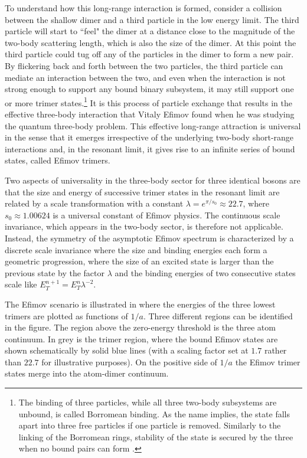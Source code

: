 To understand how this long-range interaction is formed, consider a collision between the shallow dimer and a third particle in the low energy limit. The third particle will start to ``feel" the dimer at a distance close to the magnitude of the two-body scattering length, which is also the size of the dimer. At this point the third particle could tug off any of the particles in the dimer to form a new pair. By flickering back and forth between the two particles, the third particle can mediate an interaction between the two, and even when the interaction is not strong enough to support any bound binary subsystem, it may still support one or more trimer states.\footnote{The binding of three particles, while all three two-body subsystems are unbound, is called Borromean binding. As the name implies, the state falls apart into three free particles if one particle is removed. Similarly to the linking of the Borromean rings, stability of the state is secured by the three when no bound pairs can form \cite{Kajsa_my}.} It is this process of particle exchange that results in the effective three-body interaction that Vitaly Efimov found when he was studying the quantum three-body problem. This effective long-range attraction is universal in the sense that it emerges irrespective of the underlying two-body short-range interactions and, in the resonant limit, it gives rise to an infinite series of bound states, called Efimov trimers.

Two aspects of universality in the three-body sector for three identical bosons are that the size and energy of successive trimer states in the resonant limit are related by a scale transformation with a constant $\lambda = e^{\pi/s_0} \approx 22.7$, where $s_0 \approx 1.00624$ is a universal constant of Efimov physics. The continuous scale invariance, which appears in the two-body sector, is therefore not applicable. Instead, the symmetry of the asymptotic Efimov spectrum is characterized by a discrete scale invariance where the size and binding energies each form a geometric progression, where the size of an excited state is larger than the previous state by the factor $\lambda$ and the binding energies of two consecutive states scale like $E_T^{n+1} = E_T^{n}\lambda^{-2}$.   

The Efimov scenario is illustrated in  where the energies of the three lowest trimers are plotted as functions of $1/a$. Three different regions can be identified in the figure. The region above the zero-energy threshold is the three atom continuum. In grey is the trimer region, where the bound Efimov states are shown schematically by solid blue lines (with a scaling factor set at $1.7$ rather than $22.7$ for illustrative purposes). On the positive side of $1/a$ the Efimov trimer states merge into the atom-dimer continuum.

